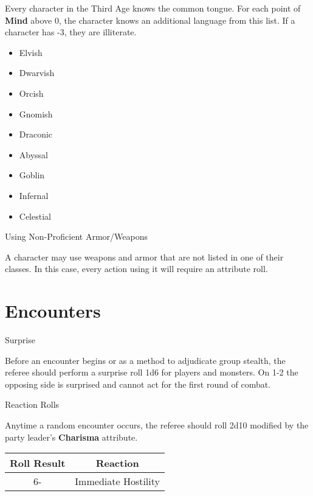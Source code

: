 \begin{multicols}{2}
Every character in the Third Age knows the common tongue. For each point of \textbf{Mind} above 0, the character knows an additional language from this list. If a character has -3, they are illiterate. 
\begin{itemize}
\setlength\itemsep{0em}
	\item Elvish
	\item Dwarvish
	\item Orcish
	\item Gnomish
	\item Draconic
	\item Abyssal
	\item Goblin
	\item Infernal
	\item Celestial
\end{itemize}

\begin{mercHeading}
Using Non-Proficient Armor/Weapons
\end{mercHeading}
A character may use weapons and armor that are not listed in one of their classes. In this case, every action using it will require an attribute roll.
\section*{Encounters}%
\begin{mercHeading}
Surprise
\end{mercHeading}

Before an encounter begins or as a method to adjudicate group stealth, the referee should perform a surprise roll 1d6 for players and monsters. On 1-2 the opposing side is surprised and cannot act for the first round of combat.

\begin{mercHeading}
Reaction Rolls
\end{mercHeading}
Anytime a random encounter occurs, the referee should roll 2d10 modified by the party leader's \textbf{Charisma} attribute.%
\begin{table}[H]

\begin{center}
\Large
{}
\begin{tabular}{ c  c  }


\textbf{
Roll Result} &\textbf{ Reaction}\\
\bottomrule
\bottomrule

6- & Immediate Hostility \\


\end{tabular}
\end{center}
\end{table}
\end{multicols}
